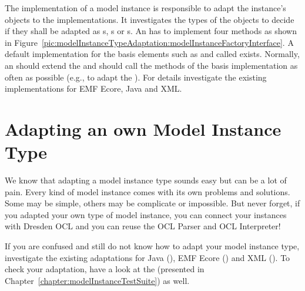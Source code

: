 The  implementation of a model instance is
responsible to adapt the instance's objects to the  
implementations. It investigates the types of the objects to decide if they
shall be adapted as s, 
s or
s. An  has to
implement four methods as shown in 
Figure~\ref{pic:modelInstanceTypeAdaptation:modelInstanceFactoryInterface}. A 
default implementation for the basis elements such as
 and  called 
 exists. Normally, an 
 should extend the 
 and should call the methods of
the basis implementation as often as possible (e.g., to adapt the 
). For details investigate the existing
implementations for \acs{EMF} Ecore, Java and \acs{XML}.



\section{Adapting an own Model Instance Type}

We know that adapting a model instance type sounds easy but can be a lot
of pain. Every kind of model instance comes with its own problems and solutions.
Some may be simple, others may be complicate or impossible. But never forget, if
you adapted your own type of model instance, you can connect your instances with
Dresden OCL and you can reuse the \acs{OCL} Parser and \acs{OCL} Interpreter!

If you are confused and still do not know how to adapt your model instance
type, investigate the existing adaptations for Java 
(), \acs{EMF} Ecore
() and \acs{XML}
().
To check your adaptation, have a look at the 
(presented in Chapter~\ref{chapter:modelInstanceTestSuite}) as well.
